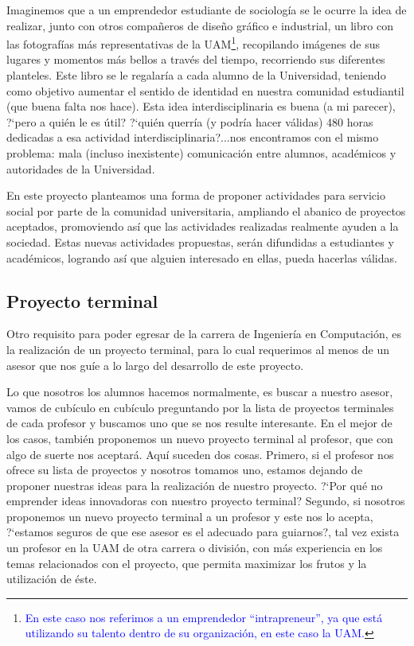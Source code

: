 \documentclass[11pt,letterpaper,titlepage]{article}
\begin{document}
Imaginemos que a un emprendedor estudiante de sociolog\'ia se le ocurre la idea de realizar, junto con otros compa\~neros de dise\~no gr\'afico e industrial, un libro con las fotograf\'ias m\'as representativas de la UAM\footnote{\textcolor{blue}{En este caso nos referimos a un emprendedor ``intrapreneur'', ya que est\'a utilizando su talento dentro de su organizaci\'on, en este caso la UAM.\cite{emprendedurismo}}}, recopilando im\'agenes de sus lugares y momentos m\'as bellos a trav\'es del tiempo, recorriendo sus diferentes planteles. Este libro se le regalar\'ia a cada alumno de la Universidad, teniendo como objetivo aumentar el sentido de identidad en nuestra comunidad estudiantil (que buena falta nos hace). Esta idea interdisciplinaria es buena (a mi parecer), ?`pero a qui\'en le es \'util? ?`qui\'en querr\'ia (y podr\'ia hacer v\'alidas) 480 horas dedicadas a esa actividad interdisciplinaria?...nos encontramos con el mismo problema: mala (incluso inexistente) comunicaci\'on entre alumnos, acad\'emicos y autoridades de la Universidad.

En este proyecto planteamos una forma de proponer actividades para servicio social por parte de la comunidad universitaria, ampliando el abanico de proyectos aceptados, promoviendo as\'i que las actividades realizadas realmente ayuden a la sociedad. Estas nuevas actividades propuestas, ser\'an difundidas a estudiantes y acad\'emicos, logrando as\'i que alguien interesado en ellas, pueda hacerlas v\'alidas.


\subsection{Proyecto terminal}
Otro requisito para poder egresar de la carrera de Ingenier\'ia en Computaci\'on, es la realizaci\'on de un proyecto terminal, para lo cual requerimos al menos de un asesor que nos gu\'ie a lo largo del desarrollo de este proyecto.

Lo que nosotros los alumnos hacemos normalmente, es buscar a nuestro asesor, vamos de cub\'iculo en cub\'iculo preguntando por la lista de proyectos terminales de cada profesor y buscamos uno que se nos resulte interesante. En el mejor de los casos, tambi\'en proponemos un nuevo proyecto terminal al profesor, que con algo de suerte nos aceptar\'a. Aqu\'i suceden dos cosas. Primero, si el profesor nos ofrece su lista de proyectos y nosotros tomamos uno, estamos dejando de proponer nuestras ideas para la realizaci\'on de nuestro proyecto. ?`Por qu\'e no emprender ideas innovadoras con nuestro proyecto terminal? Segundo, si nosotros proponemos un nuevo proyecto terminal a un profesor y este nos lo acepta, ?`estamos seguros de que ese asesor es el adecuado para guiarnos?, tal vez exista un profesor en la UAM de otra carrera o divisi\'on, con m\'as experiencia en los temas relacionados con el proyecto, que permita maximizar los frutos y la utilizaci\'on de \'este.
\end{document}
